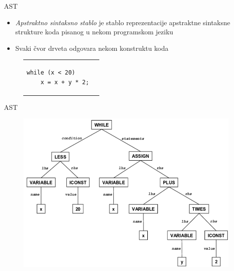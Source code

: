 \begin{frame}[fragile]{AST}
    \begin{itemize}
        \item \emph{Apstraktno sintaksno stablo} je stablo reprezentacije apstraktne sintaksne strukture koda pisanog u nekom programskom jeziku
        \item Svaki \v{c}vor drveta odgovara nekom konstruktu koda
    \end{itemize}
\begin{figure}[!h]
\centering
\begin{tabular}{ p{4.5cm} p{4.5cm} }
\begin{lstlisting}
while (x < 20)
    x = x + y * 2;
\end{lstlisting}
\end{tabular}
\end{figure}
\end{frame}


\begin{frame}[fragile]{AST}
\begin{figure}[!h]
\centering
\includegraphics[scale=0.45]{../paper/res/WhileAST.PNG}
\end{figure}
\end{frame}
